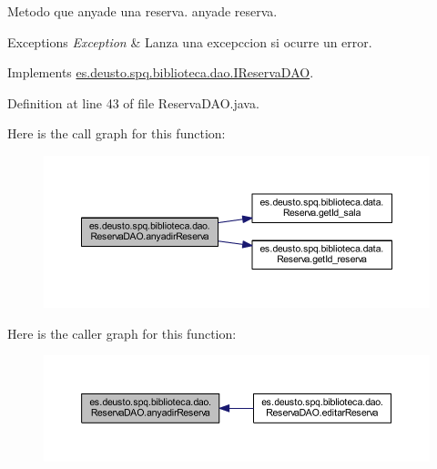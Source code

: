 Metodo que anyade una reserva.  anyade reserva. 
\begin{DoxyExceptions}{Exceptions}
{\em Exception} & Lanza una excepccion si ocurre un error. \\
\hline
\end{DoxyExceptions}


Implements \mbox{\hyperlink{interfacees_1_1deusto_1_1spq_1_1biblioteca_1_1dao_1_1_i_reserva_d_a_o_a6e0188fb8b5510723e4bc27e838c9fa1}{es.\+deusto.\+spq.\+biblioteca.\+dao.\+I\+Reserva\+D\+AO}}.



Definition at line 43 of file Reserva\+D\+A\+O.\+java.

Here is the call graph for this function\+:
\nopagebreak
\begin{figure}[H]
\begin{center}
\leavevmode
\includegraphics[width=350pt]{classes_1_1deusto_1_1spq_1_1biblioteca_1_1dao_1_1_reserva_d_a_o_ab4d4780399982bd5241fc772664e26a3_cgraph}
\end{center}
\end{figure}
Here is the caller graph for this function\+:
\nopagebreak
\begin{figure}[H]
\begin{center}
\leavevmode
\includegraphics[width=350pt]{classes_1_1deusto_1_1spq_1_1biblioteca_1_1dao_1_1_reserva_d_a_o_ab4d4780399982bd5241fc772664e26a3_icgraph}
\end{center}
\end{figure}
\mbox{\label{classes_1_1deusto_1_1spq_1_1biblioteca_1_1dao_1_1_reserva_d_a_o_a906df34a8711fd59536fc860bf3ef203}} 
